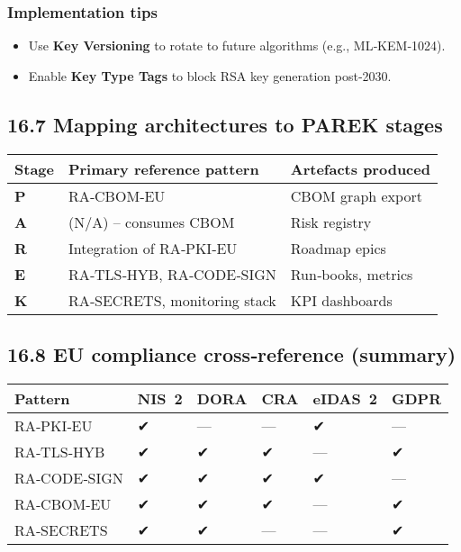 \documentclass[
  english,
]{article}
\providecommand{\tightlist}{%
  \setlength{\itemsep}{0pt}\setlength{\parskip}{0pt}}
\begin{document}
\subsubsection{Implementation tips}\label{implementation-tips-1}

\begin{itemize}
\tightlist
\item
  Use \textbf{Key Versioning} to rotate to future algorithms (e.g.,
  ML‑KEM‑1024).
\item
  Enable \textbf{Key Type Tags} to block RSA key generation post‑2030.
\end{itemize}

\subsection{16.7 Mapping architectures to PAREK
stages}\label{mapping-architectures-to-parek-stages}

\begin{longtable}[]{@{}lll@{}}
\toprule\noalign{}
Stage & Primary reference pattern & Artefacts produced \\
\midrule\noalign{}
\endhead
\bottomrule\noalign{}
\endlastfoot
\textbf{P} & RA‑CBOM‑EU & CBOM graph export \\
\textbf{A} & (N/A) -- consumes CBOM & Risk registry \\
\textbf{R} & Integration of RA‑PKI‑EU & Roadmap epics \\
\textbf{E} & RA‑TLS‑HYB, RA‑CODE‑SIGN & Run‑books, metrics \\
\textbf{K} & RA‑SECRETS, monitoring stack & KPI dashboards \\
\end{longtable}

\subsection{16.8 EU compliance cross‑reference
(summary)}\label{eu-compliance-crossreference-summary}

\begin{longtable}[]{@{}llllll@{}}
\toprule\noalign{}
Pattern & NIS~2 & DORA & CRA & eIDAS~2 & GDPR \\
\midrule\noalign{}
\endhead
\bottomrule\noalign{}
\endlastfoot
RA‑PKI‑EU & ✔ & --- & --- & ✔ & --- \\
RA‑TLS‑HYB & ✔ & ✔ & ✔ & --- & ✔ \\
RA‑CODE‑SIGN & ✔ & ✔ & ✔ & ✔ & --- \\
RA‑CBOM‑EU & ✔ & ✔ & ✔ & --- & ✔ \\
RA‑SECRETS & ✔ & ✔ & --- & --- & ✔ \\
\end{longtable}
\end{document}
